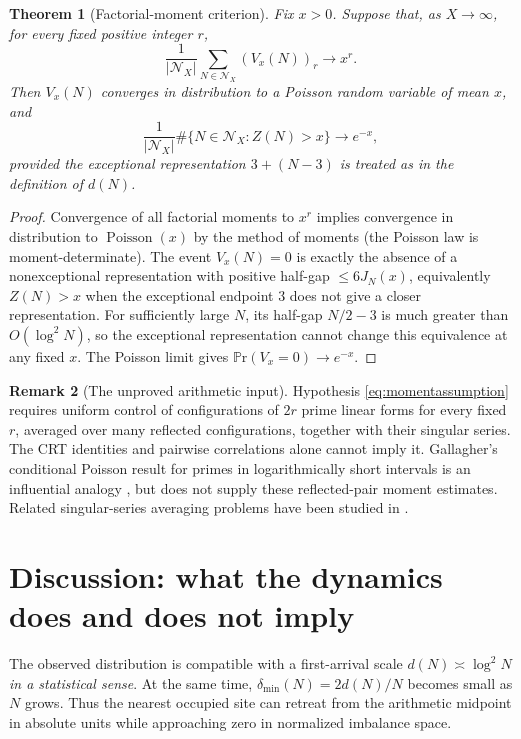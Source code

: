 \documentclass[11pt,a4paper]{article}
\newtheorem{theorem}{Theorem}[section]
\theoremstyle{definition}
\newtheorem{remark}[theorem]{Remark}
\newcommand{\Prob}{\mathbb P\mathrm r}
\begin{document}
\begin{theorem}[Factorial-moment criterion]\label{thm:poisson}
Fix $x>0$.  Suppose that, as $X\to\infty$, for every fixed positive integer $r$,
\begin{equation}\label{eq:momentassumption}
 \frac1{|\mathcal N_X|}\sum_{N\in\mathcal N_X}(V_x(N))_r\longrightarrow x^r.
\end{equation}
Then $V_x(N)$ converges in distribution to a Poisson random variable of mean $x$, and
\begin{equation}\label{eq:conditionalexp}
 \frac1{|\mathcal N_X|}\#\{N\in\mathcal N_X:Z(N)>x\}\longrightarrow e^{-x},
\end{equation}
provided the exceptional representation $3+(N-3)$ is treated as in the definition of $d(N)$.
\end{theorem}
\begin{proof}
Convergence of all factorial moments to $x^r$ implies convergence in distribution to $\operatorname{Poisson}(x)$ by the method of moments (the Poisson law is moment-determinate).  The event $V_x(N)=0$ is exactly the absence of a nonexceptional representation with positive half-gap $\le 6J_N(x)$, equivalently $Z(N)>x$ when the exceptional endpoint $3$ does not give a closer representation. For sufficiently large $N$, its half-gap $N/2-3$ is much greater than $O(\log^2N)$, so the exceptional representation cannot change this equivalence at any fixed $x$.  The Poisson limit gives $\Prob(V_x=0)\to e^{-x}$.
\end{proof}

\begin{remark}[The unproved arithmetic input]
Hypothesis \eqref{eq:momentassumption} requires uniform control of configurations of $2r$ prime linear forms for every fixed $r$, averaged over many reflected configurations, together with their singular series.  The CRT identities and pairwise correlations alone cannot imply it.  Gallagher's conditional Poisson result for primes in logarithmically short intervals is an influential analogy \cite{Gallagher1976}, but does not supply these reflected-pair moment estimates. Related singular-series averaging problems have been studied in \cite{FriedlanderGoldston1995,GoldstonHuntsNgotiaoco2017}.
\end{remark}

\section{Discussion: what the dynamics does and does not imply}
The observed distribution is compatible with a first-arrival scale $d(N)\asymp\log^2 N$ \emph{in a statistical sense}. At the same time, $\delta_{\min}(N)=2d(N)/N$ becomes small as $N$ grows. Thus the nearest occupied site can retreat from the arithmetic midpoint in absolute units while approaching zero in normalized imbalance space.
\end{document}
